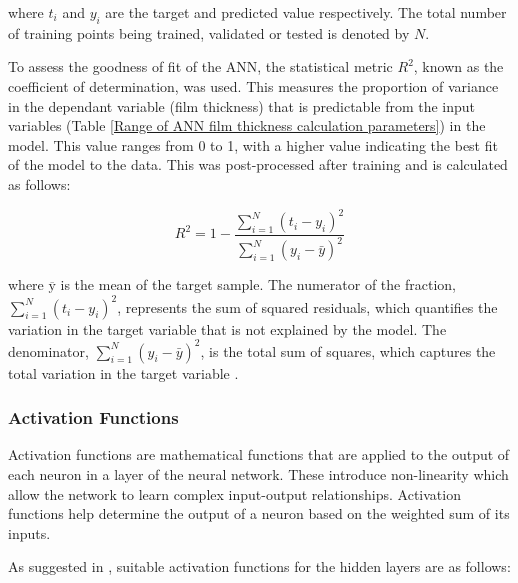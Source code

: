 where $t_i$ and $y_i$ are the target and predicted value respectively. The total number of training points being trained, validated or tested is denoted by $N$. 

To assess the goodness of fit of the ANN, the statistical metric $R^2$, known as the coefficient of determination, was used. This measures the proportion of variance in the dependant variable (film thickness) that is predictable from the input variables (Table \ref{Range of ANN film thickness calculation parameters}) in the model. This value ranges from 0 to 1, with a higher value indicating the best fit of the model to the data. This was post-processed after training and is calculated as follows:

\begin{equation}\label{R-squared}
	R^2=1-\frac{\sum_{i=1}^N\left(t_i-y_i\right)^2}{\sum_{i=1}^N\left(y_i-\bar{y}\right)^2}
\end{equation}

 where $\overline{\mathrm{y}}$ is the mean of the target sample. The numerator of the fraction, \( \sum_{i=1}^N(t_i - y_i)^2 \), represents the sum of squared residuals, which quantifies the variation in the target variable that is not explained by the model. The denominator, \( \sum_{i=1}^N(y_i - \bar{y})^2 \), is the total sum of squares, which captures the total variation in the target variable \cite{Marian2022}.

\subsubsection{Activation Functions}

Activation functions are mathematical functions that are applied to the output of each neuron in a layer of the neural network. These introduce non-linearity which allow the network to learn complex input-output relationships. Activation functions help determine the output of a neuron based on the weighted sum of its inputs.

As suggested in \cite{Marian2022}, suitable activation functions for the hidden layers are as follows:

